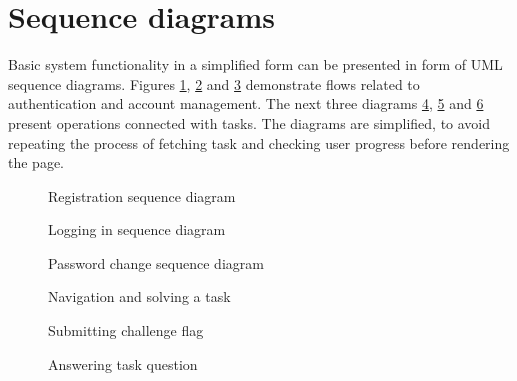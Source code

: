 \section{Sequence diagrams}

Basic system functionality in a simplified form can be presented in form of UML sequence diagrams. Figures \ref{fig:seq-register}, \ref{fig:seq-login} and \ref{fig:seq-change-pass} demonstrate flows related to authentication and account management. The next three diagrams \ref{fig:seq-task}, \ref{fig:seq-task-flag} and \ref{fig:seq-task-answer} present operations connected with tasks. The diagrams are simplified, to avoid repeating the process of fetching task and checking user progress before rendering the page.


\begin{figure}
    \centering
    
    \caption{Registration sequence diagram}
    \label{fig:seq-register}
\end{figure}

\begin{figure}
    \centering
    
    \caption{Logging in sequence diagram}
    \label{fig:seq-login}
\end{figure}

\begin{figure}
    \centering
    
    \caption{Password change sequence diagram}
    \label{fig:seq-change-pass}
\end{figure}

\begin{figure}
    \centering
    
    \caption{Navigation and solving a task}
    \label{fig:seq-task}
\end{figure}

\begin{figure}
    \centering
    
    \caption{Submitting challenge flag}
    \label{fig:seq-task-flag}
\end{figure}

\begin{figure}
    \fontsize{10}{12}\selectfont
    \centering
    
    \caption{Answering task question}
    \label{fig:seq-task-answer}
\end{figure}

